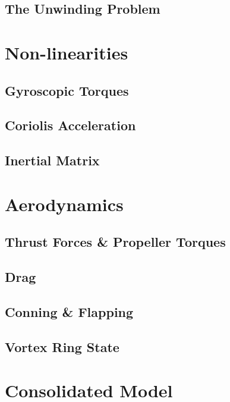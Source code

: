 \subsection{The Unwinding Problem}
\label{subsec:dynamics.rigidbody.unwinding}

\section{Non-linearities}
\label{sec:dynamics.nonlinearities}
\subsection{Gyroscopic Torques}
\label{subsec:dynamics.nonlinearities.gyrotorques}
\subsection{Coriolis Acceleration}
\label{subsec:dynamics.nonlinearities.coriolis}
\subsection{Inertial Matrix}
\label{subsec:dynamics.nonlinearities.inertia}

\section{Aerodynamics}
\label{sec:dynamics.aero}
\subsection{Thrust Forces \& Propeller Torques}
\label{subsec:dynamics.aero.bem}
\subsection{Drag}
\label{subsec:dynamics.aero.drag}
\subsection{Conning \& Flapping}
\label{subsec:dynamics.aero.flap}
\subsection{Vortex Ring State}
\label{subsec:dynamics.aero.vrs}

\section{Consolidated Model}
\label{sec:dynamics.model}